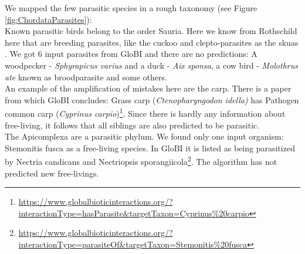       We mapped the few parasitic species in a rough taxonomy (see Figure \ref{fig:ChordataParasites}): \\
      Known parasitic birds belong to the order Sauria. Here we know from Rothschild here that are 
        breeding parasites, like the cuckoo and clepto-parasites as the skuas \cite{Rothschild1957}. We
        got 6 input parasites from GloBI and there are no predictions: A woodpecker - 
        \textit{Sphyrapicus varius} and a duck - \textit{Aix sponsa}, a cow bird - \textit{Molothrus ate} 
        known as broodparasite and some others. \\
      An example of the amplification of mistakes here are the carp. There is a paper from which GloBI 
        concludes: Grass carp (\textit{Ctenopharyngodon idella)} has Pathogen common carp 
        (\textit{Cyprinus carpio})\footnote{
          \hyperlink{https://www.globalbioticinteractions.org/?interactionType=hasParasite&targetTaxon=Cyprinus\%20carpio}
          {https://www.globalbioticinteractions.org/?interactionType=hasParasite\&targetTaxon=Cyprinus\%20carpio}
        }. Since there is hardly any information about free-living, it follows that all siblings are 
        also predicted to be parasitic. \\

      The Apicomplexa are a parasitic phylum. We found only one input organism: Stemonitis fusca as a 
        free-living species. In GloBI it is listed as being parasitized by Nectria candicans and Nectriopsis 
        sporangiicola\footnote{
          \hyperlink{https://www.globalbioticinteractions.org/?interactionType=parasiteOf&targetTaxon=Stemonitis\%20fusca}
          {https://www.globalbioticinteractions.org/?interactionType=parasiteOf\&targetTaxon=Stemonitis\%20fusca}
        }. The algorithm has not predicted new free-livings. \\

